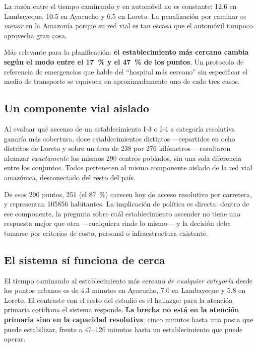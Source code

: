 \documentclass[11pt,a4paper]{article}
\begin{document}
La razón entre el tiempo caminando y en automóvil no es constante: \num{12.6} en Lambayeque,
\num{10.5} en Ayacucho y \num{6.5} en Loreto. La penalización por caminar es \emph{menor} en
la Amazonía porque su red vial es tan escasa que el automóvil tampoco aprovecha gran cosa.

Más relevante para la planificación: \textbf{el establecimiento más cercano cambia según el
modo entre el \SI{17}{\percent} y el \SI{47}{\percent} de los puntos}. Un protocolo de
referencia de emergencias que hable del ``hospital más cercano'' sin especificar el medio de
transporte se equivoca en aproximadamente uno de cada tres casos.

\subsection{Un componente vial aislado}

Al evaluar qué ascenso de un establecimiento I-3 o I-4 a categoría resolutiva ganaría más
cobertura, doce establecimientos distintos —repartidos en ocho distritos de Loreto y sobre un
área de \num{238} por \num{276} kilómetros— resultaron alcanzar \emph{exactamente} los mismos
\num{290} centros poblados, sin una sola diferencia entre los conjuntos. Todos pertenecen al
mismo componente aislado de la red vial amazónica, desconectado del resto del país.

De esos \num{290} puntos, \num{251} (el \SI{87}{\percent}) carecen hoy de acceso resolutivo
por carretera, y representan \num{105856} habitantes. La implicación de política es directa:
dentro de ese componente, la pregunta sobre cuál establecimiento ascender no tiene una
respuesta mejor que otra —cualquiera rinde lo mismo— y la decisión debe tomarse por criterios
de costo, personal o infraestructura existente.

\subsection{El sistema sí funciona de cerca}

El tiempo caminando al establecimiento más cercano \emph{de cualquier categoría} desde los
puntos urbanos es de \num{4.3} minutos en Ayacucho, \num{7.0} en Lambayeque y \num{5.8} en
Loreto. El contraste con el resto del estudio es el hallazgo: para la atención primaria
cotidiana el sistema responde. \textbf{La brecha no está en la atención primaria sino en la
capacidad resolutiva}: cinco minutos hasta una posta que puede estabilizar, frente a
\num{47}--\num{126} minutos hasta un establecimiento que puede operar.
\end{document}
